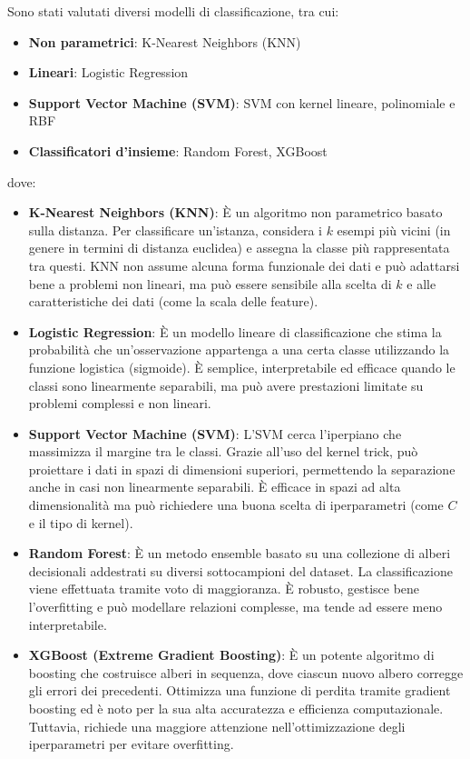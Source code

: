 \documentclass[minted, draw]{../tex/hebdomon}
\begin{document}
Sono stati valutati diversi modelli di classificazione, tra cui:


\begin{itemize}
\item \textbf{Non parametrici}: K-Nearest Neighbors (KNN)
\item \textbf{Lineari}: Logistic Regression
\item \textbf{Support Vector Machine (SVM)}: SVM con kernel lineare, polinomiale e RBF 
\item \textbf{Classificatori d’insieme}: Random Forest, XGBoost
\end{itemize}

dove:

\begin{itemize}

\item \textbf{K-Nearest Neighbors (KNN)}: È un algoritmo non parametrico basato sulla distanza. Per classificare un'istanza, considera i $k$ esempi più vicini (in genere in termini di distanza euclidea) e assegna la classe più rappresentata tra questi. KNN non assume alcuna forma funzionale dei dati e può adattarsi bene a problemi non lineari, ma può essere sensibile alla scelta di $k$ e alle caratteristiche dei dati (come la scala delle feature).

\item \textbf{Logistic Regression}: È un modello lineare di classificazione che stima la probabilità che un'osservazione appartenga a una certa classe utilizzando la funzione logistica (sigmoide). È semplice, interpretabile ed efficace quando le classi sono linearmente separabili, ma può avere prestazioni limitate su problemi complessi e non lineari.

\item \textbf{Support Vector Machine (SVM)}: L'SVM cerca l'iperpiano che massimizza il margine tra le classi. Grazie all'uso del kernel trick, può proiettare i dati in spazi di dimensioni superiori, permettendo la separazione anche in casi non linearmente separabili. È efficace in spazi ad alta dimensionalità ma può richiedere una buona scelta di iperparametri (come $C$ e il tipo di kernel).

\item \textbf{Random Forest}: È un metodo ensemble basato su una collezione di alberi decisionali addestrati su diversi sottocampioni del dataset. La classificazione viene effettuata tramite voto di maggioranza. È robusto, gestisce bene l'overfitting e può modellare relazioni complesse, ma tende ad essere meno interpretabile.

\item \textbf{XGBoost (Extreme Gradient Boosting)}: È un potente algoritmo di boosting che costruisce alberi in sequenza, dove ciascun nuovo albero corregge gli errori dei precedenti. Ottimizza una funzione di perdita tramite gradient boosting ed è noto per la sua alta accuratezza e efficienza computazionale. Tuttavia, richiede una maggiore attenzione nell’ottimizzazione degli iperparametri per evitare overfitting.

\end{itemize}
\end{document}

